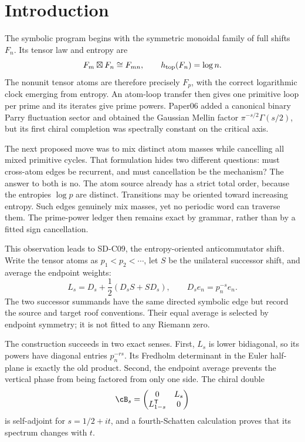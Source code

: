 \section{Introduction}
\label{sec:introduction}

The symbolic program begins with the symmetric monoidal family of full
shifts $F_n$.  Its tensor law and entropy are
\[
 F_m\boxtimes F_n\cong F_{mn},\qquad h_{\rm top}(F_n)=\log n.
\]
The nonunit tensor atoms are therefore precisely $F_p$, with the correct
logarithmic clock emerging from entropy.  An atom-loop transfer then gives
one primitive loop per prime and its iterates give prime powers.  Paper06
added a canonical binary Parry fluctuation sector and obtained the Gaussian
Mellin factor $\pi^{-s/2}\Gamma(s/2)$, but its first chiral completion was
spectrally constant on the critical axis.

The next proposed move was to mix distinct atom masses while cancelling all
mixed primitive cycles.  That formulation hides two different questions:
must cross-atom edges be recurrent, and must cancellation be the mechanism?
The answer to both is no.  The atom source already has a strict total order,
because the entropies $\log p$ are distinct.  Transitions may be oriented
toward increasing entropy.  Such edges genuinely mix masses, yet no periodic
word can traverse them.  The prime-power ledger then remains exact by
grammar, rather than by a fitted sign cancellation.

This observation leads to SD-C09, the entropy-oriented anticommutator shift.
Write the tensor atoms as $p_1<p_2<\cdots$, let $S$ be the unilateral
successor shift, and average the endpoint weights:
\[
 L_s=D_s+\frac12(D_sS+SD_s),
 \qquad D_se_n=p_n^{-s}e_n.                 \tag{1.1}
\]
The two successor summands have the same directed symbolic edge but record
the source and target roof conventions.  Their equal average is selected by
endpoint symmetry; it is not fitted to any Riemann zero.



The construction succeeds in two exact senses.  First, $L_s$ is lower
bidiagonal, so its powers have diagonal entries $p_n^{-rs}$.  Its Fredholm
determinant in the Euler half-plane is exactly the old product.  Second, the
endpoint average prevents the vertical phase from being factored from only
one side.  The chiral double
\[
 \cB_s=
 \begin{pmatrix}0&L_s\\L_{1-s}^{\mathsf T}&0\end{pmatrix}
\]
is self-adjoint for $s=1/2+it$, and a fourth-Schatten calculation proves that
its spectrum changes with $t$.

